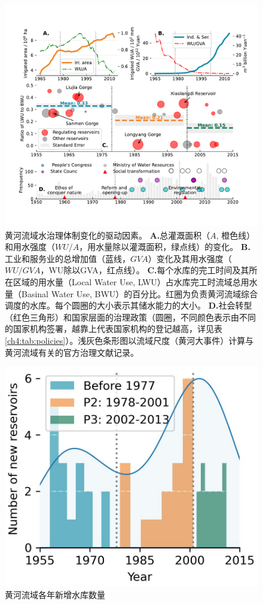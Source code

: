

\begin{figure}[th!]
	\centering
	\includegraphics[width=\textwidth]{img/ch4/causes.pdf}
	\caption[黄河流域水治理体制变化的驱动因素]{
		黄河流域水治理体制变化的驱动因素。
		\textbf{A.}总灌溉面积（$A$, 橙色线）和用水强度（$WU/A$，用水量除以灌溉面积，绿点线）的变化。
        \textbf{B.}工业和服务业的总增加值（蓝线，$GVA$）变化及其用水强度（$WU/GVA$，WU除以GVA，红点线）。
        \textbf{C.}每个水库的完工时间及其所在区域的用水量（Local Water Use, LWU）占水库完工时流域总用水量（Basinal Water Use, BWU）的百分比。红圈为负责黄河流域综合调度的水库。每个圆圈的大小表示其储水能力的大小。
        \textbf{D.}社会转型（红色三角形）和国家层面的治理政策（圆圈，不同颜色表示由不同的国家机构签署，越靠上代表国家机构的登记越高，详见表\ref{ch4:tab:policies}）。浅灰色条形图以流域尺度（黄河大事件）计算与黄河流域有关的官方治理文献记录。}\label{ch4:fig:mechanism}
\end{figure}


\begin{figure}[tb]
    \centering
    \includegraphics[width=0.6\linewidth]{img/ch4/reservoirs.jpg}
    \caption{黄河流域各年新增水库数量}\label{ch4:fig:reservoirs}
\end{figure}


